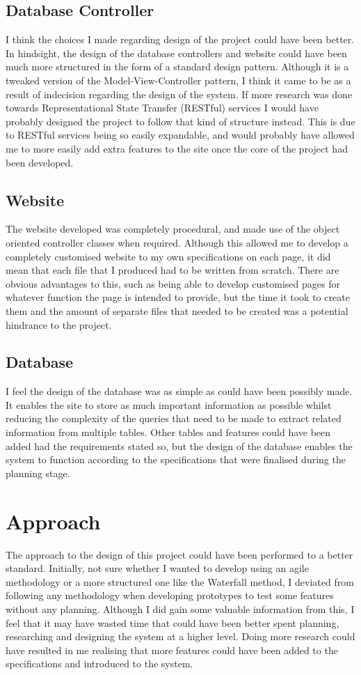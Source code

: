 \subsection{Database Controller}
I think the choices I made regarding design of the project could have been better. In hindsight, the design of the database controllers and website could have been much more structured in the form of a standard design pattern. Although it is a tweaked version of the Model-View-Controller pattern, I think it came to be as a result of indecision regarding the design of the system. If more research was done towards Representational State Transfer (RESTful) services I would have probably designed the project to follow that kind of structure instead. This is due to RESTful services being so easily expandable, and would probably have allowed me to more easily add extra features to the site once the core of the project had been developed.

\subsection{Website}
The website developed was completely procedural, and made use of the object oriented controller classes when required. Although this allowed me to develop a completely customised website to my own specifications on each page, it did mean that each file that I produced had to be written from scratch. There are obvious advantages to this, such as being able to develop customised pages for whatever function the page is intended to provide, but the time it took to create them and the amount of separate files that needed to be created was a potential hindrance to the project.

\subsection{Database}
I feel the design of the database was as simple as could have been possibly made. It enables the site to store as much important information as possible whilst reducing the complexity of the queries that need to be made to extract related information from multiple tables. Other tables and features could have been added had the requirements stated so, but the design of the database enables the system to function according to the specifications that were finalised during the planning stage.

\section{Approach}
The approach to the design of this project could have been performed to a better standard. Initially, not sure whether I wanted to develop using an agile methodology or a more structured one like the Waterfall method, I deviated from following any methodology when developing prototypes to test some features without any planning. Although I did gain some valuable information from this, I feel that it may have wasted time that could have been better spent planning, researching and designing the system at a higher level. Doing more research could have resulted in me realising that more features could have been added to the specifications and introduced to the system.

